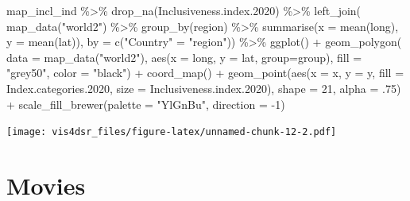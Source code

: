 \documentclass[
]{krantz}
\makeatletter
\newenvironment{Shaded}{\begin{snugshade}}{\end{snugshade}}
\newcommand{\AttributeTok}[1]{\textcolor[rgb]{0.61,0.61,0.61}{#1}}
\newcommand{\DecValTok}[1]{\textcolor[rgb]{0.06,0.06,0.06}{#1}}
\newcommand{\FloatTok}[1]{\textcolor[rgb]{0.06,0.06,0.06}{#1}}
\newcommand{\FunctionTok}[1]{\textcolor[rgb]{0,0,0}{#1}}
\newcommand{\NormalTok}[1]{#1}
\newcommand{\OtherTok}[1]{\textcolor[rgb]{0.37,0.37,0.37}{#1}}
\newcommand{\SpecialCharTok}[1]{\textcolor[rgb]{0,0,0}{#1}}
\newcommand{\StringTok}[1]{\textcolor[rgb]{0.5,0.5,0.5}{#1}}
\newenvironment{kframe}{%
\medskip{}
\setlength{\fboxsep}{.8em}
 \def\at@end@of@kframe{}%
 \ifinner\ifhmode%
  \def\at@end@of@kframe{\end{minipage}}%
  \begin{minipage}{\columnwidth}%
 \fi\fi%
 \def\FrameCommand##1{\hskip\@totalleftmargin \hskip-\fboxsep
 \colorbox{shadecolor}{##1}\hskip-\fboxsep
     \hskip-\linewidth \hskip-\@totalleftmargin \hskip\columnwidth}%
 \MakeFramed {\advance\hsize-\width
   \@totalleftmargin\z@ \linewidth\hsize
   \@setminipage}}%
 {\par\unskip\endMakeFramed%
 \at@end@of@kframe}
\renewenvironment{Shaded}{\begin{kframe}}{\end{kframe}}
\makeatother
\begin{document}
\begin{Shaded}
\begin{Highlighting}[]
\NormalTok{map\_incl\_ind }\SpecialCharTok{\%\textgreater{}\%}
  \FunctionTok{drop\_na}\NormalTok{(Inclusiveness.index}\FloatTok{.2020}\NormalTok{) }\SpecialCharTok{\%\textgreater{}\%}
  \FunctionTok{left\_join}\NormalTok{(}
    \FunctionTok{map\_data}\NormalTok{(}\StringTok{"world2"}\NormalTok{) }\SpecialCharTok{\%\textgreater{}\%} 
      \FunctionTok{group\_by}\NormalTok{(region) }\SpecialCharTok{\%\textgreater{}\%}
      \FunctionTok{summarise}\NormalTok{(}\AttributeTok{x =} \FunctionTok{mean}\NormalTok{(long),}
                \AttributeTok{y =} \FunctionTok{mean}\NormalTok{(lat)), }
    \AttributeTok{by =} \FunctionTok{c}\NormalTok{(}\StringTok{"Country"} \OtherTok{=} \StringTok{"region"}\NormalTok{)) }\SpecialCharTok{\%\textgreater{}\%}
  \FunctionTok{ggplot}\NormalTok{() }\SpecialCharTok{+}
    \FunctionTok{geom\_polygon}\NormalTok{(}
      \AttributeTok{data =} \FunctionTok{map\_data}\NormalTok{(}\StringTok{"world2"}\NormalTok{),}
      \FunctionTok{aes}\NormalTok{(}\AttributeTok{x =}\NormalTok{ long,}
          \AttributeTok{y =}\NormalTok{ lat,}
          \AttributeTok{group=}\NormalTok{group),}
      \AttributeTok{fill =} \StringTok{"grey50"}\NormalTok{,}
      \AttributeTok{color =} \StringTok{"black"}\NormalTok{) }\SpecialCharTok{+}
    \FunctionTok{coord\_map}\NormalTok{() }\SpecialCharTok{+}
    \FunctionTok{geom\_point}\NormalTok{(}\FunctionTok{aes}\NormalTok{(}\AttributeTok{x =}\NormalTok{ x, }\AttributeTok{y =}\NormalTok{ y, }
                   \AttributeTok{fill =}\NormalTok{ Index.categories}\FloatTok{.2020}\NormalTok{, }
                   \AttributeTok{size =}\NormalTok{ Inclusiveness.index}\FloatTok{.2020}\NormalTok{),}
               \AttributeTok{shape =} \DecValTok{21}\NormalTok{,}
               \AttributeTok{alpha =}\NormalTok{ .}\DecValTok{75}\NormalTok{) }\SpecialCharTok{+}
    \FunctionTok{scale\_fill\_brewer}\NormalTok{(}\AttributeTok{palette =} \StringTok{"YlGnBu"}\NormalTok{, }\AttributeTok{direction =} \SpecialCharTok{{-}}\DecValTok{1}\NormalTok{)}
\end{Highlighting}
\end{Shaded}

\texttt{[image: vis4dsr\_files/figure-latex/unnamed-chunk-12-2.pdf]}

\hypertarget{movies}{%
\section{Movies}\label{movies}}
\end{document}
